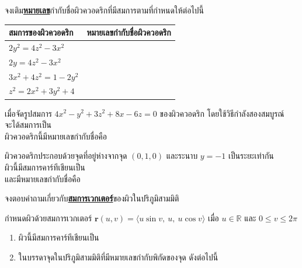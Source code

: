 \documentclass[12pt,final]{novelette} %
\begin{document}
\begin{question}
\begin{question}
        \item จงเติม\uline{\bf หมายเลข}กำกับชื่อผิวควอดริกที่มีสมการตามที่กำหนดให้ต่อไปนี้
        \medskip
        \begin{center}
            \renewcommand{\arraystretch}{1.6}
            \begin{tabular}{|C{5cm}|C{6cm}|}
                \hline
                \bf สมการของผิวควอดริก     & \bf หมายเลขกำกับชื่อผิวควอดริก \\\hline\hline
                $2y^2 = 4z^2 - 3x^2$     &                          \\\hline
                $2y = 4z^2 - 3x^2$       &                          \\\hline
                $3x^2 + 4z^2 = 1 - 2y^2$ &                          \\\hline
                $z^2 = 2x^2 + 3y^2 + 4$  &                          \\\hline
            \end{tabular}
        \end{center}

        \item เมื่อจัดรูปสมการ $4x^2 - y^2 + 3z^2 + 8x - 6z = 0$ ของผิวควอดริก โดยใช้วิธีกำลังสองสมบูรณ์ \\[.5em]
        จะได้สมการเป็น \ansboxi{26em} \\[.5em]
        ผิวควอดริกนี้มีหมายเลขกำกับชื่อคือ \ansboxq

        \item ผิวควอดริกประกอบด้วยจุดที่อยู่ห่างจากจุด $(0,1,0)$ และระนาบ $y = -1$ เป็นระยะเท่ากัน \\[.5em]
        ผิวนี้มีสมการคาร์ทีเชียนเป็น \ansboxL \\[.5em]
        และมีหมายเลขกำกับชื่อคือ \ansboxq
    \end{question}

    \clearpage

    \item {}
     จงตอบคำถามเกี่ยวกับ\uline{\bf สมการเวกเตอร์}ของผิวในปริภูมิสามมิติ
    \begin{question}
        \item กำหนดผิวด้วยสมการเวกเตอร์ $\mathbf r(u, v) = \langle u \sin v,\ u,\ u \cos v \rangle$ เมื่อ $u \in \mathbb R$ และ $0 \leq v \leq 2 \pi$
        \begin{enumerate}[label=(\alph*),topsep=0.5em,itemsep=1.5em]
            \item ผิวนี้มีสมการคาร์ทีเชียนเป็น \ansboxL
            \item ในบรรดาจุดในปริภูมิสามมิติที่มีหมายเลขกำกับพิกัดของจุด ดังต่อไปนี้


\end{enumerate}
\end{question}
\end{question}
\end{document}
